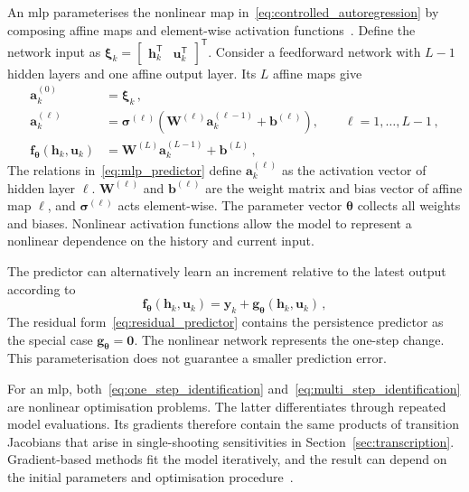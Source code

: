 An \ac{mlp} parameterises the nonlinear map
in~\eqref{eq:controlled_autoregression} by composing affine maps and element-wise
activation functions~\cite[ch.~6]{Goodfellow2016}. %
Define the network input as
$\boldsymbol{\xi}_k =
\begin{bmatrix}\mathbf{h}_k^\mathsf{T}&\mathbf{u}_k^\mathsf{T}\end{bmatrix}^\mathsf{T}$.
Consider a feedforward network with $L-1$ hidden layers and one affine output layer. Its $L$
affine maps give
%
\begin{align}
    \mathbf{a}^{(0)}_k
    &= \boldsymbol{\xi}_k \,, \nonumber \\
    \mathbf{a}^{(\ell)}_k
    &= \boldsymbol{\sigma}^{(\ell)}\!\left(
       \mathbf{W}^{(\ell)}\mathbf{a}^{(\ell-1)}_k
       + \mathbf{b}^{(\ell)}\right),
       \qquad \ell = 1, \dots, L-1 \,, \nonumber \\
    \mathbf{f}_{\boldsymbol{\theta}}(\mathbf{h}_k,\mathbf{u}_k)
    &= \mathbf{W}^{(L)}\mathbf{a}^{(L-1)}_k + \mathbf{b}^{(L)} \,,
    \label{eq:mlp_predictor}
\end{align}
%
The relations in~\eqref{eq:mlp_predictor} define $\mathbf{a}^{(\ell)}_k$ as the activation
vector of hidden layer $\ell$. $\mathbf{W}^{(\ell)}$ and $\mathbf{b}^{(\ell)}$ are the
weight matrix and bias vector of affine map $\ell$, and
$\boldsymbol{\sigma}^{(\ell)}$ acts element-wise. The parameter vector
$\boldsymbol{\theta}$ collects all weights and biases. Nonlinear activation functions allow
the model to represent a nonlinear dependence on the history and current input.

The predictor can alternatively learn an increment relative to the latest output according to
%
\begin{equation}
    \mathbf{f}_{\boldsymbol{\theta}}(\mathbf{h}_k,\mathbf{u}_k)
    = \mathbf{y}_k
    + \mathbf{g}_{\boldsymbol{\theta}}(\mathbf{h}_k,\mathbf{u}_k) \,,
    \label{eq:residual_predictor}
\end{equation}
%
The residual form~\eqref{eq:residual_predictor} contains the persistence predictor as the
special case $\mathbf{g}_{\boldsymbol{\theta}}=\mathbf{0}$. The nonlinear network represents
the one-step change. This parameterisation does not guarantee a smaller prediction error.

For an \ac{mlp}, both~\eqref{eq:one_step_identification}
and~\eqref{eq:multi_step_identification} are nonlinear optimisation problems. The latter
differentiates through repeated model evaluations. Its gradients therefore contain the same
products of transition Jacobians that arise in single-shooting sensitivities in
Section~\ref{sec:transcription}. Gradient-based methods fit the model iteratively, and the
result can depend on the initial parameters and optimisation
procedure~\cite[sec.~6.2]{Goodfellow2016}. %

